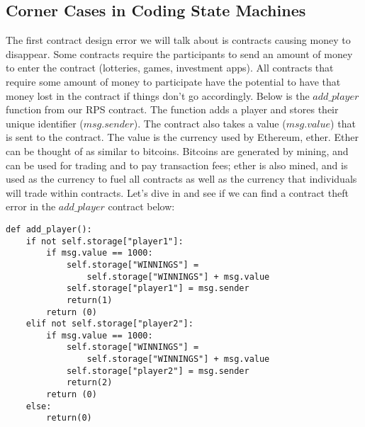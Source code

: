 \documentclass[10pt,twocolumn,letterpaper]{article}
\begin{document}
\subsection{Corner Cases in Coding State Machines}
The first contract design error we will talk about is contracts causing money to disappear. Some contracts require the participants to send an amount of money to enter the contract (lotteries, games, investment apps). All contracts that require some amount of money to participate have the potential to have that money lost in the contract if things don't go accordingly. Below is the $add\_player$ function from our RPS contract. The function adds a player and stores their unique identifier ($msg.sender$). The contract also takes a value ($msg.value$) that is sent to the contract. The value is the currency used by Ethereum, ether. Ether can be thought of as similar to bitcoins. Bitcoins are generated by mining, and can be used for trading and to pay transaction fees; ether is also mined, and is used as the currency to fuel all contracts as well as the currency that individuals will trade within contracts. Let's dive in and see if we can find a contract theft error in the $add\_player$ contract below: 

\begin{mdframed}
\begin{verbatim}
def add_player():
	if not self.storage["player1"]:
		if msg.value == 1000:
			self.storage["WINNINGS"] = 
				self.storage["WINNINGS"] + msg.value
			self.storage["player1"] = msg.sender
			return(1)
		return (0)
	elif not self.storage["player2"]:
		if msg.value == 1000:
			self.storage["WINNINGS"] = 
				self.storage["WINNINGS"] + msg.value
			self.storage["player2"] = msg.sender
			return(2)
		return (0)
	else:
		return(0)
\end{verbatim}
\end{mdframed}
\end{document}
